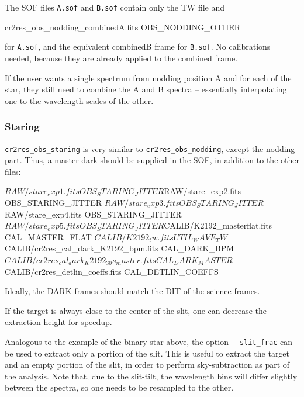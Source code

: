 The SOF files \verb!A.sof! and \verb!B.sof! contain only the TW file and
\begin{shell}[fontsize=\small]
    cr2res_obs_nodding_combinedA.fits OBS_NODDING_OTHER
\end{shell}
for \verb!A.sof!, and the equivalent combinedB frame for \verb!B.sof!.
No calibrations needed, because they are already applied to the combined frame.

If the user wants a single spectrum from nodding position A and for each of the
star, they still need to combine the A and B spectra -- essentially interpolating
one to the wavelength scales of the other.

\subsubsection{Staring}

\verb!cr2res_obs_staring! is very similar to \verb!cr2res_obs_nodding!, except
the nodding part. Thus, a master-dark should be supplied in the SOF, in addition
to the other files:
\begin{shell}[fontsize=\small]
$RAW/stare_exp1.fits        OBS_STARING_JITTER
$RAW/stare_exp2.fits        OBS_STARING_JITTER
$RAW/stare_exp3.fits        OBS_STARING_JITTER
$RAW/stare_exp4.fits        OBS_STARING_JITTER
$RAW/stare_exp5.fits        OBS_STARING_JITTER
$CALIB/K2192_masterflat.fits                  CAL_MASTER_FLAT
$CALIB/K2192_tw.fits                          UTIL_WAVE_TW
$CALIB/cr2res_cal_dark_K2192_bpm.fits         CAL_DARK_BPM
$CALIB/cr2res_cal_dark_K2192_30s_master.fits  CAL_DARK_MASTER
$CALIB/cr2res_detlin_coeffs.fits              CAL_DETLIN_COEFFS
\end{shell}  
Ideally, the DARK frames should match the DIT of the science frames.

If the target is always close to the center of the slit, one can decrease the extraction height for speedup.
\begin{shell}[fontsize=\small]
\end{shell}  

Analogous to the example of the binary star above, the option \verb!--slit_frac!
can be used to extract only a portion of the slit. This is useful to extract the
target and an empty portion of the slit, in order to perform sky-subtraction as
part of the analysis. Note that, due to the slit-tilt, the wavelength bins will
differ slightly between the spectra, so one needs to be resampled to the other.

